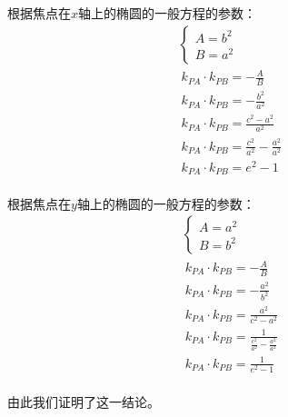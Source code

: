 \documentclass[UTF8]{ctexart}
\begin{document}
    根据焦点在$x$轴上的椭圆的一般方程的参数：\vspace{7pt}
    \begin{align}
        &\begin{cases}
            A=b^2\\[1mm]
            B=a^2
        \end{cases}\\[3mm]
        &~k_{PA}\cdot k_{PB}=-\frac{A}{B}\\[3mm]
        &~k_{PA}\cdot k_{PB}=-\frac{b^2}{a^2}\\[3mm]
        &~k_{PA}\cdot k_{PB}=\frac{c^2-a^2}{a^2}\\[3mm]
        &~k_{PA}\cdot k_{PB}=\frac{c^2}{a^2}-\frac{a^2}{a^2}~~~~~~~~\\[3mm]
        &~k_{PA}\cdot k_{PB}=e^2-1
    \end{align}\\
    根据焦点在$y$轴上的椭圆的一般方程的参数：\vspace{7pt}
    \begin{align}
        &\begin{cases}
            A=a^2\\[1mm]
            B=b^2
        \end{cases}\\[3mm]
        &~k_{PA}\cdot k_{PB}=-\frac{A}{B}\\[3mm]
        &~k_{PA}\cdot k_{PB}=-\frac{a^2}{b^2}\\[3mm]
        &~k_{PA}\cdot k_{PB}=\frac{a^2}{c^2-a^2}\\[3mm]
        &~k_{PA}\cdot k_{PB}=\frac{1}{\frac{c^2}{a^2}-\frac{a^2}{a^2}}~~~~~~~~\\[3mm]
        &~k_{PA}\cdot k_{PB}=\frac{1}{e^2-1}
    \end{align}\\
    由此我们证明了这一结论。

\newpage
\end{document}
